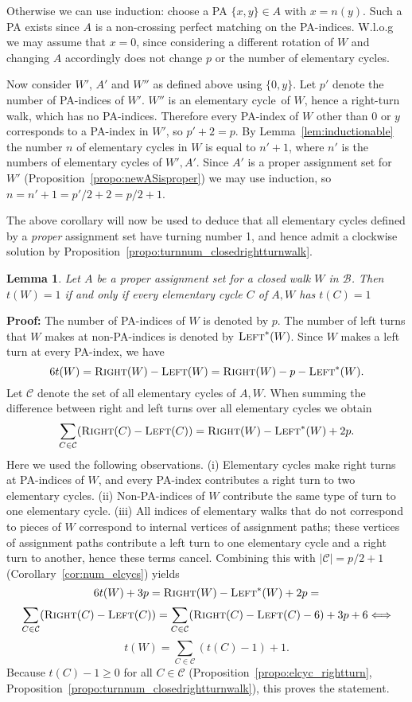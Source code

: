 \documentclass{llncs}
\newcommand{\PF}{{\bf Proof: }}
\newcommand{\QED}{\hspace*{\fill}{$\Box$}\medskip}
\newcommand{\BW}{\mathcal{B}}
\newcommand{\convex}{\mbox{\sc Right}}
\newcommand{\concave}{\mbox{\sc Left}}
\newcommand{\EC}{\mathcal{C}}
\newcommand{\npa}{p}
\newcommand{\elcyc}{elementary cycle}
\newtheorem{lem}[thm]{Lemma}
\begin{document}
Otherwise we can use induction: choose a PA $\{x,y\}\in A$ with $x=n(y)$. Such a PA exists since $A$ is a non-crossing perfect matching on the PA-indices. W.l.o.g we may assume that $x=0$, since considering a different rotation of $W$ and changing $A$ accordingly does not change $\npa$ or the number of \elcyc s.
 
Now consider $W'$, $A'$ and $W''$ as defined above using $\{0,y\}$.
Let $\npa'$ denote the number of PA-indices of $W'$.
$W''$ is an \elcyc\ of $W$, hence a right-turn walk, which has no PA-indices.
Therefore every PA-index of $W$ other than $0$ or $y$ corresponds to a PA-index in $W'$, so $\npa'+2=\npa$.
By Lemma~\ref{lem:inductionable} the number $n$ of \elcyc s in $W$ is equal to $n'+1$, where $n'$ is the numbers of \elcyc s of $W',A'$. 
Since $A'$ is a proper assignment set for $W'$ (Proposition~\ref{propo:newASisproper}) we may use induction, so $n=n'+1=\npa'/2+2=\npa/2+1$.
\QED


The above corollary will now be used to deduce that all elementary cycles defined by a {\em proper} assignment set have turning number 1, and hence admit a clockwise solution by Proposition~\ref{propo:turnnum_closedrightturnwalk}.


\begin{lem}
\label{lem:key_counting}
Let $A$ be a proper assignment set for a closed walk $W$ in $\BW$. Then $t(W)=1$ if and only if every elementary cycle $C$ of $A,W$ has $t(C)=1$
\end{lem}

\PF
The number of PA-indices of $W$ is denoted by $\npa$.
The number of left turns that $W$ makes at non-PA-indices is denoted by $\concave^*(W)$. Since $W$ makes a left turn at every PA-index, we have \[
6t(W)=\convex(W)-\concave(W)=\convex(W)-\npa-\concave^*(W).
\]
Let $\EC$ denote the set of all elementary cycles of $A,W$.
When summing the difference between right and left turns over all elementary cycles we obtain
\[
\sum_{C\in\EC} (\convex(C)-\concave(C))=\convex(W)-\concave^*(W)+2\npa.
\]
Here we used the following observations. (i) Elementary cycles make right turns at PA-indices of $W$, and every PA-index contributes a right turn to two elementary cycles. (ii) Non-PA-indices of $W$ contribute the same type of turn to one elementary cycle. (iii) All indices of elementary walks that do not correspond to pieces of $W$ correspond to internal vertices of assignment paths; these vertices of assignment paths contribute a left turn to one elementary cycle and a right turn to another, hence these terms cancel.
Combining this with $|\EC|=\npa/2+1$ (Corollary~\ref{cor:num_elcycs}) yields
\[
6t(W)+3\npa=\convex(W)-\concave^*(W)+2\npa=
\]
\[
\sum_{C\in\EC} (\convex(C)-\concave(C))=\sum_{C\in\EC} (\convex(C)-\concave(C)-6)+3\npa+6 \Longleftrightarrow
\]
\[
t(W)=\sum_{C\in\EC} (t(C)-1)+1.
\]
Because $t(C)-1\geq 0$ for all $C\in \EC$ (Proposition~\ref{propo:elcyc_rightturn}, Proposition~\ref{propo:turnnum_closedrightturnwalk}), this proves the statement.
\QED
\end{document}
